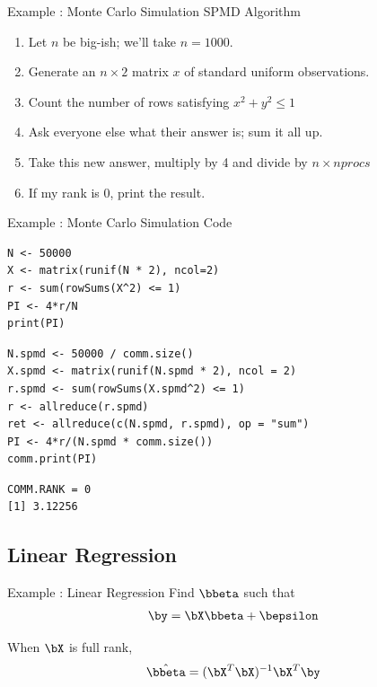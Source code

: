 \begin{frame}[fragile]
  \begin{block}{Example \showex :  Monte Carlo Simulation SPMD Algorithm}\pause
    \begin{enumerate}
     \item Let $n$ be big-ish; we'll take $n=1000$.
     \item Generate an $n\times 2$ matrix $x$ of standard uniform observations.
     \item Count the number of rows satisfying $x^2 + y^2 \leq 1$
     \item Ask everyone else what their answer is; sum it all up.
     \item Take this new answer, multiply by 4 and divide by $n\times nprocs$
     \item If my rank is 0, print the result.
    \end{enumerate}
  \end{block}
\end{frame}


\begin{frame}
  \begin{exampleblock}{Example \showex :  Monte Carlo Simulation Code}\pause
\begin{lstlisting}[title=Serial Code]
N <- 50000
X <- matrix(runif(N * 2), ncol=2)
r <- sum(rowSums(X^2) <= 1)
PI <- 4*r/N
print(PI)
\end{lstlisting}

\begin{lstlisting}[title=Parallel Code]
N.spmd <- 50000 / comm.size()
X.spmd <- matrix(runif(N.spmd * 2), ncol = 2)
r.spmd <- sum(rowSums(X.spmd^2) <= 1)
r <- allreduce(r.spmd)
ret <- allreduce(c(N.spmd, r.spmd), op = "sum")
PI <- 4*r/(N.spmd * comm.size())
comm.print(PI)
\end{lstlisting}

\begin{lstlisting}[title=Sample output]
COMM.RANK = 0
[1] 3.12256
\end{lstlisting}
  \end{exampleblock}
\end{frame}



\subsection{Linear Regression}


\begin{frame}
  \begin{block}{Example \countex :  Linear Regression}\pause
      Find $\bbeta$ such that
      \begin{align*}
      \by = \bX\bbeta + \bepsilon
      \end{align*}

      When $\bX$ is full rank,
      \begin{align*}
      \hat{\bbeta} = (\bX^T\bX)^{-1}\bX^T\by \label{math:ols}
      \end{align*}
  \end{block}
\end{frame}


